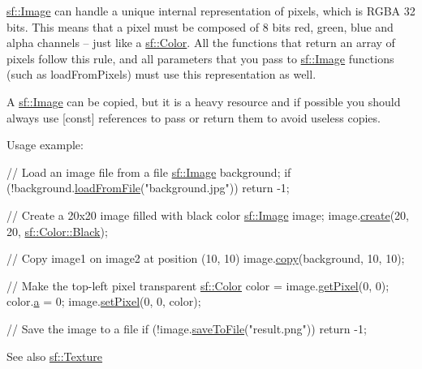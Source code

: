 \hyperlink{classsf_1_1_image}{sf\+::\+Image} can handle a unique internal representation of pixels, which is R\+G\+B\+A 32 bits. This means that a pixel must be composed of 8 bits red, green, blue and alpha channels -- just like a \hyperlink{classsf_1_1_color}{sf\+::\+Color}. All the functions that return an array of pixels follow this rule, and all parameters that you pass to \hyperlink{classsf_1_1_image}{sf\+::\+Image} functions (such as load\+From\+Pixels) must use this representation as well.

A \hyperlink{classsf_1_1_image}{sf\+::\+Image} can be copied, but it is a heavy resource and if possible you should always use \mbox{[}const\mbox{]} references to pass or return them to avoid useless copies.

Usage example\+: 
\begin{DoxyCode}
\textcolor{comment}{// Load an image file from a file}
\hyperlink{classsf_1_1_image}{sf::Image} background;
\textcolor{keywordflow}{if} (!background.\hyperlink{classsf_1_1_image_a9e4f2aa8e36d0cabde5ed5a4ef80290b}{loadFromFile}(\textcolor{stringliteral}{"background.jpg"}))
    \textcolor{keywordflow}{return} -1;

\textcolor{comment}{// Create a 20x20 image filled with black color}
\hyperlink{classsf_1_1_image}{sf::Image} image;
image.\hyperlink{classsf_1_1_image_a2a67930e2fd9ad97cf004e918cf5832b}{create}(20, 20, \hyperlink{classsf_1_1_color_a77c688197b981338f0b19dc58bd2facd}{sf::Color::Black});

\textcolor{comment}{// Copy image1 on image2 at position (10, 10)}
image.\hyperlink{classsf_1_1_image_ab2fa337c956f85f93377dcb52153a45a}{copy}(background, 10, 10);

\textcolor{comment}{// Make the top-left pixel transparent}
\hyperlink{classsf_1_1_color}{sf::Color} color = image.\hyperlink{classsf_1_1_image_a8c8460e311dcb00557cb00a81c29163d}{getPixel}(0, 0);
color.\hyperlink{classsf_1_1_color_a56dbdb47d5f040d9b78ac6a0b8b3a831}{a} = 0;
image.\hyperlink{classsf_1_1_image_a9fd329b8cd7d4439e07fb5d3bb2d9744}{setPixel}(0, 0, color);

\textcolor{comment}{// Save the image to a file}
\textcolor{keywordflow}{if} (!image.\hyperlink{classsf_1_1_image_aec0ed16b67df7b512aaa5c53388ba14e}{saveToFile}(\textcolor{stringliteral}{"result.png"}))
    \textcolor{keywordflow}{return} -1;
\end{DoxyCode}


\begin{DoxySeeAlso}{See also}
\hyperlink{classsf_1_1_texture}{sf\+::\+Texture} 
\end{DoxySeeAlso}


